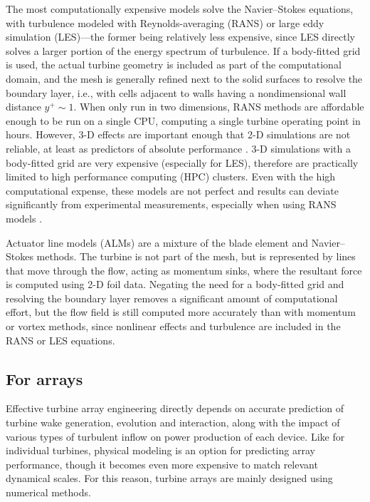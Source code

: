 The most computationally expensive models solve the Navier--Stokes equations,
with turbulence modeled with Reynolds-averaging (RANS) or large eddy simulation
(LES)---the former being relatively less expensive, since LES directly solves a
larger portion of the energy spectrum of turbulence. If a body-fitted grid is
used, the actual turbine geometry is included as part of the computational
domain, and the mesh is generally refined next to the solid surfaces to resolve
the boundary layer, i.e., with cells adjacent to walls having a nondimensional
wall distance $y^+ \sim 1$. When only run in two dimensions, RANS methods are
affordable enough to be run on a single CPU, computing a single turbine
operating point in hours. However, 3-D effects are important enough that 2-D
simulations are not reliable, at least as predictors of absolute performance
\cite{Li2013}. 3-D simulations with a body-fitted grid are very expensive
(especially for LES), therefore are practically limited to high performance
computing (HPC) clusters. Even with the high computational expense, these models
are not perfect and results can deviate significantly from experimental
measurements, especially when using RANS models \cite{Li2013}.

Actuator line models (ALMs) are a mixture of the blade element and
Navier--Stokes methods. The turbine is not part of the mesh, but is represented
by lines that move through the flow, acting as momentum sinks, where the
resultant force is computed using 2-D foil data. Negating the need for a
body-fitted grid and resolving the boundary layer removes a significant amount
of computational effort, but the flow field is still computed more accurately
than with momentum or vortex methods, since nonlinear effects and turbulence are
included in the RANS or LES equations.


\subsection{For arrays}

Effective turbine array engineering directly depends on accurate prediction of
turbine wake generation, evolution and interaction, along with the impact of
various types of turbulent inflow on power production of each device. Like for
individual turbines, physical modeling is an option for predicting array
performance, though it becomes even more expensive to match relevant dynamical
scales. For this reason, turbine arrays are mainly designed using numerical
methods.

